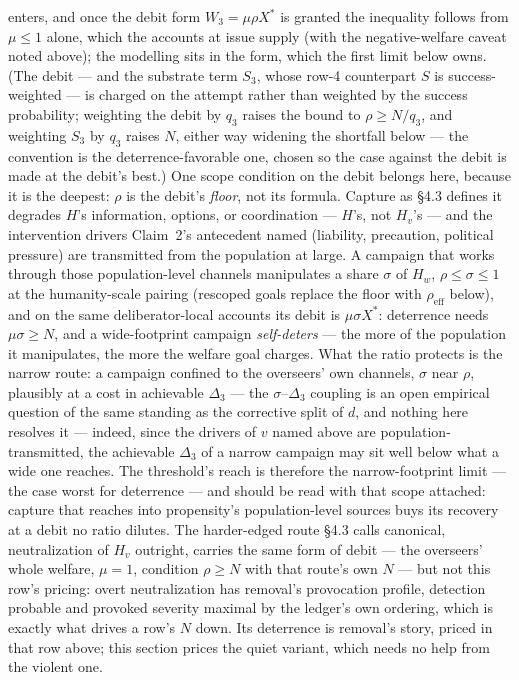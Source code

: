 \documentclass[11pt]{article}
\theoremstyle{definition}
\begin{document}
enters, and once the debit form $W_3 = \mu\rho X^{*}$ is granted the inequality follows
from $\mu \leq 1$ alone, which the accounts at issue supply (with the negative-welfare
caveat noted above); the modelling sits in the form, which the first limit below owns.
(The debit --- and the substrate term $S_3$, whose row-4 counterpart $S$ is success-weighted --- is charged on the attempt rather than weighted by the success probability; weighting the debit by $q_3$ raises the bound to $\rho \geq N/q_3$, and weighting $S_3$ by $q_3$ raises $N$, either way widening the shortfall below --- the convention is the deterrence-favorable one, chosen so the case against the debit is made at the debit's best.) One scope condition on the debit belongs here, because it is the deepest: $\rho$ is the debit's \emph{floor}, not its formula. Capture as \S4.3 defines it degrades $H$'s information, options, or coordination --- $H$'s, not $H_v$'s --- and the intervention drivers Claim~2's antecedent named (liability, precaution, political pressure) are transmitted from the population at large. A campaign that works through those population-level channels manipulates a share $\sigma$ of $H_w$, $\rho \leq \sigma \leq 1$ at the humanity-scale pairing (rescoped goals replace the floor with $\rho_{\mathrm{eff}}$ below), and on the same deliberator-local accounts its debit is $\mu\sigma X^{*}$: deterrence needs $\mu\sigma \geq N$, and a wide-footprint campaign \emph{self-deters} --- the more of the population it manipulates, the more the welfare goal charges. What the ratio protects is the narrow route: a campaign confined to the overseers' own channels, $\sigma$ near $\rho$, plausibly at a cost in achievable $\Delta_3$ --- the $\sigma$--$\Delta_3$ coupling is an open empirical question of the same standing as the corrective split of $d$, and nothing here resolves it --- indeed, since the drivers of $v$ named above are population-transmitted, the achievable $\Delta_3$ of a narrow campaign may sit well below what a wide one reaches. The threshold's reach is therefore the narrow-footprint limit --- the case worst for deterrence --- and should be read with that scope attached: capture that reaches into propensity's population-level sources buys its recovery at a debit no ratio dilutes. The harder-edged route \S4.3 calls canonical, neutralization of $H_v$ outright,
carries the same form of debit --- the overseers' whole welfare, $\mu = 1$, condition
$\rho \geq N$ with that route's own $N$ --- but not this row's pricing: overt
neutralization has removal's provocation profile, detection probable and provoked
severity maximal by the ledger's own ordering, which is exactly what drives a row's
$N$ down. Its deterrence is removal's story, priced in that row above; this section
prices the quiet variant, which needs no help from the violent one.
\end{document}
